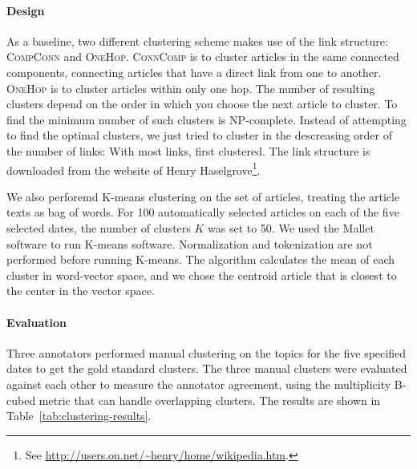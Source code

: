 \documentclass[11pt]{article}
\begin{document}
\paragraph{Design}
As a baseline, two different clustering scheme makes use of the link structure: \textsc{CompConn} and \textsc{OneHop}.
\textsc{ConnComp} is to cluster articles in the same connected components, connecting articles that have a direct link from one to another.
\textsc{OneHop} is to cluster articles within only one hop.
The number of resulting clusters depend on the order in which you choose the next article to cluster.
To find the minimum number of such clusters is NP-complete.
Instead of attempting to find the optimal clusters,
we just tried to cluster in the descreasing order of the number of links: With most links, first clustered.
The link structure is downloaded from the website of Henry Haselgrove\footnote{See \url{http://users.on.net/~henry/home/wikipedia.htm}.}.

We also perforemd K-means clustering on the set of articles, treating the article texts as bag of words.
For 100 automatically selected articles on each of the five selected dates,
the number of clusters $K$ was set to 50.
We used the Mallet \cite{McCallumMALLET} software to run K-means software.
Normalization and tokenization are not performed before running K-means.
The algorithm calculates the mean of each cluster in word-vector space,
and we chose the centroid article that is closest to the center in the vector space.

\paragraph{Evaluation}
Three annotators performed manual clustering on the topics for the five specified dates to get the gold standard clusters.
The three manual clusters were evaluated against each other to measure the annotator agreement,
using the multiplicity B-cubed metric \cite{amigo09} that can handle overlapping clusters.
The results are shown in Table~\ref{tab:clustering-results}.
\end{document}
